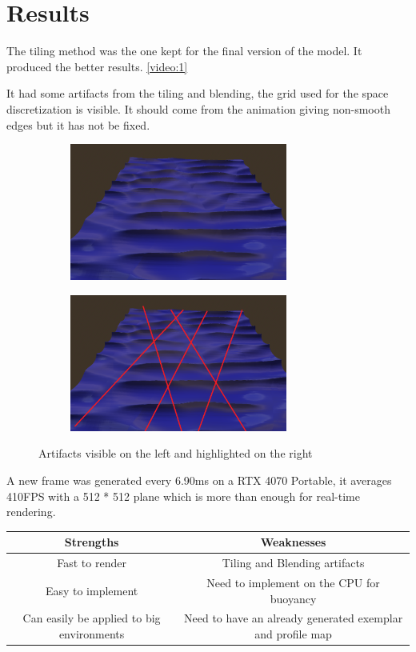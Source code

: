 \documentclass{article}
\begin{document}
\section{Results}

The tiling method was the one kept for the final version of the model. It produced the better results. \ref{video:1}

It had some artifacts from the tiling and blending, the grid used for the space discretization is visible. It should come from the animation giving non-smooth edges but it has not be fixed.


\begin{figure}[H]
    \centering
    \begin{subfigure}[b]{0.48\linewidth}
        \centering
        \includegraphics[height=4.5cm, keepaspectratio]{images/anoh.png}
    \end{subfigure}
    \hfill
    \begin{subfigure}[b]{0.48\linewidth}
        \centering
        \includegraphics[height=4.5cm, keepaspectratio]{images/aoh.png}
    \end{subfigure}
    \caption{Artifacts visible on the left and highlighted on the right}
\end{figure}

A new frame was generated every 6.90ms on a RTX 4070 Portable, it averages 410FPS with a 512 * 512 plane which is more than enough for real-time rendering.


\begin{tabular}{cc}
Strengths & Weaknesses\\
 \hline
 Fast to render & Tiling and Blending artifacts\\
Easy to implement &  Need to implement on the CPU for buoyancy\\
Can easily be applied to big environments& Need to have an already generated exemplar and profile map\\
    \end{tabular}
\end{document}
